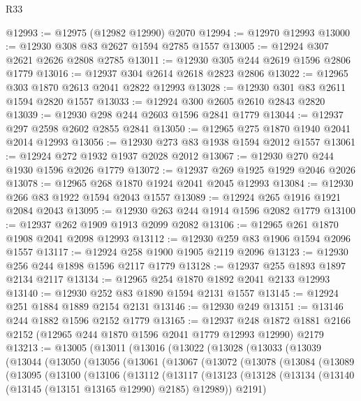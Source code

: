 \begin{lexlean}{R33}
\begin{coremodule}
@12993 := @12975 (@12982 @12990) @2070
@12994 := @12970 @12993
@13000 := @12930 @308 @83 @2627 @1594 @2785 @1557
@13005 := @12924 @307 @2621 @2626 @2808 @2785
@13011 := @12930 @305 @244 @2619 @1596 @2806 @1779
@13016 := @12937 @304 @2614 @2618 @2823 @2806
@13022 := @12965 @303 @1870 @2613 @2041 @2822 @12993
@13028 := @12930 @301 @83 @2611 @1594 @2820 @1557
@13033 := @12924 @300 @2605 @2610 @2843 @2820
@13039 := @12930 @298 @244 @2603 @1596 @2841 @1779
@13044 := @12937 @297 @2598 @2602 @2855 @2841
@13050 := @12965 @275 @1870 @1940 @2041 @2014 @12993
@13056 := @12930 @273 @83 @1938 @1594 @2012 @1557
@13061 := @12924 @272 @1932 @1937 @2028 @2012
@13067 := @12930 @270 @244 @1930 @1596 @2026 @1779
@13072 := @12937 @269 @1925 @1929 @2046 @2026
@13078 := @12965 @268 @1870 @1924 @2041 @2045 @12993
@13084 := @12930 @266 @83 @1922 @1594 @2043 @1557
@13089 := @12924 @265 @1916 @1921 @2084 @2043
@13095 := @12930 @263 @244 @1914 @1596 @2082 @1779
@13100 := @12937 @262 @1909 @1913 @2099 @2082
@13106 := @12965 @261 @1870 @1908 @2041 @2098 @12993
@13112 := @12930 @259 @83 @1906 @1594 @2096 @1557
@13117 := @12924 @258 @1900 @1905 @2119 @2096
@13123 := @12930 @256 @244 @1898 @1596 @2117 @1779
@13128 := @12937 @255 @1893 @1897 @2134 @2117
@13134 := @12965 @254 @1870 @1892 @2041 @2133 @12993
@13140 := @12930 @252 @83 @1890 @1594 @2131 @1557
@13145 := @12924 @251 @1884 @1889 @2154 @2131
@13146 := @12930 @249
@13151 := @13146 @244 @1882 @1596 @2152 @1779
@13165 := @12937
    @248
    @1872
    @1881
    @2166
    @2152
    (@12965 @244 @1870 @1596 @2041 @1779 @12993 @12990)
    @2179
@13213 := @13005
    (@13011
      (@13016
        (@13022
          (@13028
            (@13033
              (@13039
                (@13044
                  (@13050
                    (@13056
                      (@13061
                        (@13067
                          (@13072
                            (@13078
                              (@13084
                                (@13089
                                  (@13095
                                    (@13100
                                      (@13106
                                        (@13112
                                          (@13117
                                            (@13123
                                              (@13128
                                                (@13134
                                                  (@13140
                                                    (@13145 (@13151 @13165 @12990) @2185)
                                                    @12989))
                                                @2191)

\end{coremodule}
\end{lexlean}
